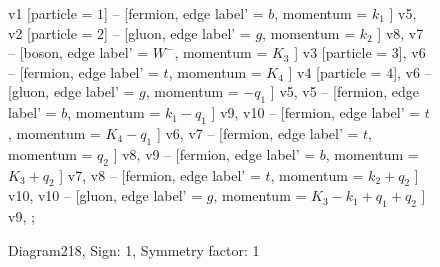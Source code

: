 \documentclass{revtex4}
\begin{document}
\begin{figure}[!htb]
\begin{center}
{    %
v1 [particle = \(1\)] -- [fermion, edge label' = \(b\), momentum = \(k_{1}\) ] v5, 
v2 [particle = \(2\)] -- [gluon, edge label' = \(g\), momentum = \(k_{2}\) ] v8, 
v7 -- [boson, edge label' = \(W^{-}\), momentum = \(K_{3}\) ] v3 [particle = \(3\)], 
v6 -- [fermion, edge label' = \(t\), momentum = \(K_{4}\) ] v4 [particle = \(4\)], 
v6 -- [gluon, edge label' = \(g\), momentum = \(-q_{1}\) ] v5, 
v5 -- [fermion, edge label' = \(b\), momentum = \(k_{1} - q_{1}\) ] v9, 
v10 -- [fermion, edge label' = \(t\), momentum = \(K_{4} - q_{1}\) ] v6, 
v7 -- [fermion, edge label' = \(t\), momentum = \(q_{2}\) ] v8, 
v9 -- [fermion, edge label' = \(b\), momentum = \(K_{3} + q_{2}\) ] v7, 
v8 -- [fermion, edge label' = \(t\), momentum = \(k_{2} + q_{2}\) ] v10, 
v10 -- [gluon, edge label' = \(g\), momentum = \(K_{3} - k_{1} + q_{1} + q_{2}\) ] v9, 
};
\end{center}
\caption{Diagram218, Sign: 1, Symmetry factor: 1}
\end{figure}
\newpage
\end{document}
